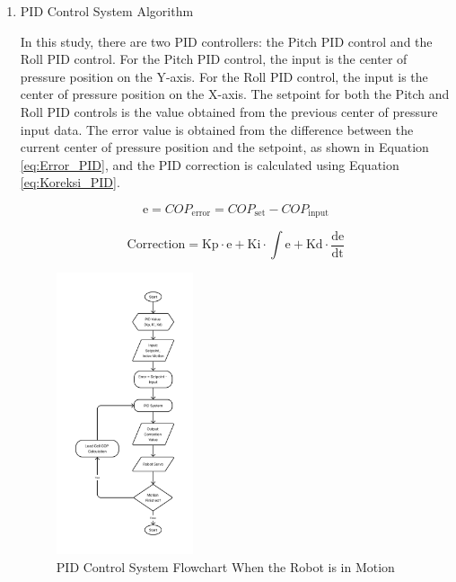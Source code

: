 \begin{enumerate}[label=\Alph*.]
    \item PID Control System Algorithm
    \label{subsec:pidcontrolalgorithm}

    \hspace*{1em} In this study, there are two PID controllers: the Pitch PID control and the Roll PID control. For the Pitch PID control, the input is the center of pressure position on the Y-axis. For the Roll PID control, the input is the center of pressure position on the X-axis. The setpoint for both the Pitch and Roll PID controls is the value obtained from the previous center of pressure input data. The error value is obtained from the difference between the current center of pressure position and the setpoint, as shown in Equation \ref{eq:Error_PID}, and the PID correction is calculated using Equation \ref{eq:Koreksi_PID}.

    \begin{equation}
      \mathrm{e} = COP_{\mathrm{error}} = COP_{\mathrm{set}} - COP_{\mathrm{input}}
      \label{eq:Error_PID}
    \end{equation}

    \begin{equation}
      \mathrm{Correction} = \mathrm{Kp} \cdot \mathrm{e} + \mathrm{Ki} \cdot \int \mathrm{e} + \mathrm{Kd} \cdot \frac{\mathrm{de}}{\mathrm{dt}}
      \label{eq:Koreksi_PID}
    \end{equation}

    \begin{figure} [h] \centering
      \includegraphics[width=0.38\textwidth]{gambar/Flow_Kontrol.png}
      \caption{PID Control System Flowchart When the Robot is in Motion}
      \label{fig:Flow_Kontrol}
    \end{figure}
    

\end{enumerate}
